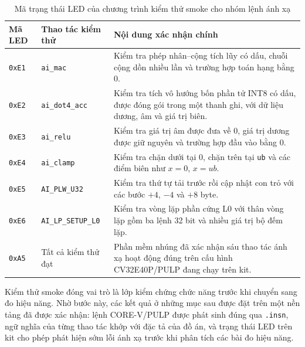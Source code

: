 \documentclass[../DoAn.tex]{subfiles}
\begin{document}
\begin{table}[H]
    \centering
    \footnotesize
    \renewcommand{\arraystretch}{1.10}
    \begin{tabular}{|>{\centering\arraybackslash}p{1.55cm}|>{\raggedright\arraybackslash}p{3.40cm}|>{\raggedright\arraybackslash}p{7.55cm}|}
        \hline
        \textbf{Mã LED} & \textbf{Thao tác kiểm thử} & \textbf{Nội dung xác nhận chính} \\
        \hline
        \texttt{0xE1} & \texttt{ai\_mac} & Kiểm tra phép nhân--cộng tích lũy có dấu, chuỗi cộng dồn nhiều lần và trường hợp toán hạng bằng 0. \\
        \hline
        \texttt{0xE2} & \texttt{ai\_dot4\_acc} & Kiểm tra tích vô hướng bốn phần tử INT8 có dấu, được đóng gói trong một thanh ghi, với dữ liệu dương, âm và giá trị biên. \\
        \hline
        \texttt{0xE3} & \texttt{ai\_relu} & Kiểm tra giá trị âm được đưa về 0, giá trị dương được giữ nguyên và trường hợp đầu vào bằng 0. \\
        \hline
        \texttt{0xE4} & \texttt{ai\_clamp} & Kiểm tra chặn dưới tại 0, chặn trên tại \texttt{ub} và các điểm biên như \(x=0\), \(x=ub\). \\
        \hline
        \texttt{0xE5} & \texttt{AI\_PLW\_U32} & Kiểm tra thứ tự tải trước rồi cập nhật con trỏ với các bước \(+4\), \(-4\) và \(+8\) byte. \\
        \hline
        \texttt{0xE6} & \texttt{AI\_LP\_SETUP\_L0} & Kiểm tra vòng lặp phần cứng L0 với thân vòng lặp gồm ba lệnh 32 bit và nhiều giá trị bộ đếm lặp. \\
        \hline
        \texttt{0xA5} & Tất cả kiểm thử đạt & Phần mềm nhúng đã xác nhận sáu thao tác ánh xạ hoạt động đúng trên cấu hình CV32E40P/PULP đang chạy trên kit. \\
        \hline
    \end{tabular}
    \caption{Mã trạng thái LED của chương trình kiểm thử smoke cho nhóm lệnh ánh xạ}
    \label{tab:pulp-smoke-tests}
\end{table}

Kiểm thử smoke đóng vai trò là lớp kiểm chứng chức năng trước khi chuyển sang đo hiệu năng. Nhờ bước này, các kết quả ở những mục sau được đặt trên một nền tảng đã được xác nhận: lệnh CORE-V/PULP được phát sinh đúng qua \texttt{.insn}, ngữ nghĩa của từng thao tác khớp với đặc tả của đồ án, và trạng thái LED trên kit cho phép phát hiện sớm lỗi ánh xạ trước khi phân tích các bài đo hiệu năng.
\end{document}
